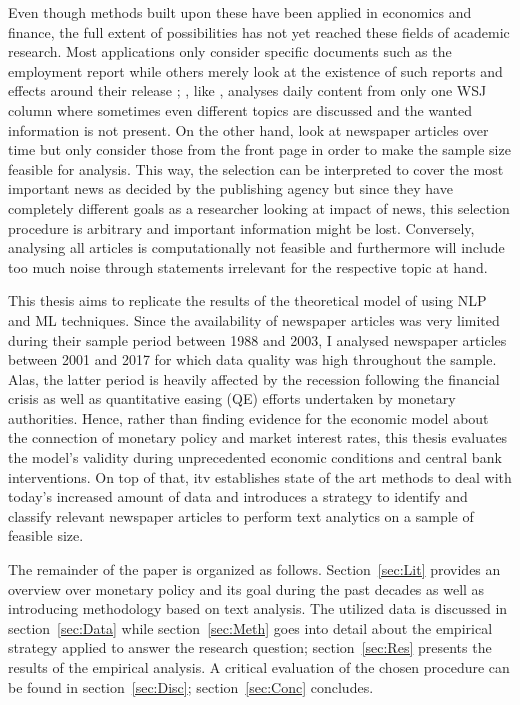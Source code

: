 Even though methods built upon these have been applied in economics and finance, the full extent of possibilities has not yet reached these fields of academic research. Most applications only consider specific documents such as the employment report \parencite{Hautsch.2002,Hess.2004} while others merely look at the existence of such reports and effects around their release \parencite{Bomfim.2003,Hautsch.2011,Lucca.2015}; \textcite{Tetlock.2007}, like \textcite{Ellingsen.2001}, analyses daily content from only one WSJ column where sometimes even different topics are discussed and the wanted information is not present. On the other hand, \textcite{Manela.2017} look at newspaper articles over time but only consider those from the front page in order to make the sample size feasible for analysis. This way, the selection can be interpreted to cover the most important news as decided by the publishing agency but since they have completely different goals as a researcher looking at impact of news, this selection procedure is arbitrary and important information might be lost. Conversely, analysing all articles is computationally not feasible and furthermore will include too much noise through statements irrelevant for the respective topic at hand.

This thesis aims to replicate the results of the theoretical model of \textcite{Ellingsen.2001} using NLP and ML techniques. Since the availability of newspaper articles was very limited during their sample period between 1988 and 2003, I analysed newspaper articles between 2001 and 2017 for which data quality was high throughout the sample. Alas, the latter period is heavily affected by the recession following the financial crisis as well as quantitative easing (QE) efforts undertaken by monetary authorities. Hence, rather than finding evidence for the economic model about the connection of monetary policy and market interest rates, this thesis evaluates the model's validity during unprecedented economic conditions and central bank interventions. On top of that, itv establishes state of the art methods to deal with today's increased amount of data and introduces a strategy to identify and classify relevant newspaper articles to perform text analytics on a sample of feasible size. 

The remainder of the paper is organized as follows. Section~\ref{sec:Lit} provides an overview over monetary policy and its goal during the past decades as well as introducing methodology based on text analysis. The utilized data is discussed in section~\ref{sec:Data} while section~\ref{sec:Meth} goes into detail about the empirical strategy applied to answer the research question; section~\ref{sec:Res} presents the results of the empirical analysis. A critical evaluation of the chosen procedure can be found in section~\ref{sec:Disc}; section~\ref{sec:Conc} concludes.
%
%